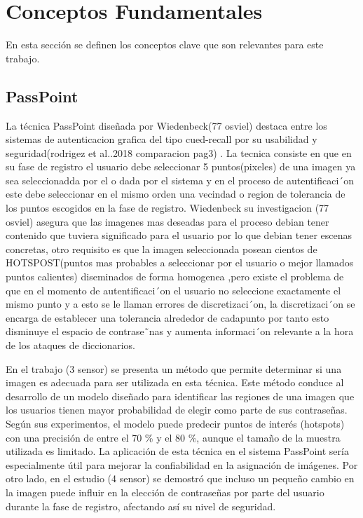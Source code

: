 \documentclass[12pt]{report}
\begin{document}
\section{Conceptos Fundamentales}
En esta sección se definen los conceptos clave que son relevantes para este trabajo. 

\subsection{PassPoint}
	La técnica PassPoint diseñada por Wiedenbeck(77 osviel) destaca entre los sistemas de autenticacion grafica del tipo cued-recall por su usabilidad y seguridad(rodrigez et al..2018 comparacion pag3) .
	La tecnica consiste en que  en su fase de registro el
	usuario debe seleccionar 5 puntos(pixeles) de una imagen ya sea seleccionadda por el o dada por el sistema  y en el proceso de
	autentificaci´on este debe seleccionar en el mismo orden una vecindad o region de tolerancia de los puntos escogidos en la fase de registro.
	Wiedenbeck su investigacion (77 osviel) asegura que las imagenes mas deseadas para el proceso debian tener contenido que tuviera significado para el usuario por lo que debian tener escenas concretas, otro requisito es que la imagen seleccionada posean cientos de HOTSPOST(puntos mas probables a seleccionar por el usuario o mejor llamados puntos calientes) diseminados de forma homogenea
	,pero existe el problema de que en el momento de autentificaci´on el usuario no seleccione exactamente el mismo punto y a esto se le llaman errores de discretizaci´on, la discretizaci´on se encarga de establecer una tolerancia alrededor de cadapunto por tanto esto disminuye el espacio de contrase˜nas y aumenta informaci´on relevante a la hora de los ataques de diccionarios.
	
	En el trabajo (3 sensor) se presenta un método que permite determinar si una imagen es adecuada para ser utilizada en esta técnica. Este método conduce al desarrollo de un modelo diseñado para identificar las regiones de una imagen que los usuarios tienen mayor probabilidad de elegir como parte de sus contraseñas. Según sus experimentos, el modelo puede predecir puntos de interés (hotspots) con una precisión de entre el 70 \% y el 80 \%, aunque el tamaño de la muestra utilizada es limitado. La aplicación de esta técnica en el sistema PassPoint sería especialmente útil para mejorar la confiabilidad en la asignación de imágenes. Por otro lado, en el estudio (4 sensor) se demostró que incluso un pequeño cambio en la imagen puede influir en la elección de contraseñas por parte del usuario durante la fase de registro, afectando así su nivel de seguridad.    
\end{document}
